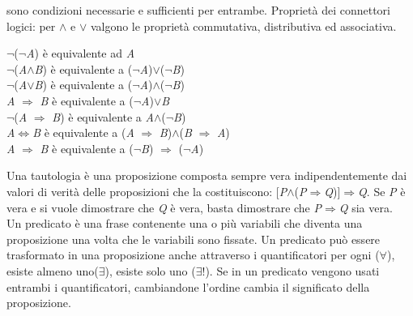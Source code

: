 sono condizioni necessarie e sufficienti per entrambe. Propriet\`a dei connettori logici: per $\wedge$ e $\lor$ valgono le propriet\`a commutativa, distributiva ed
associativa. 
\begin{center}
$\neg$($\neg$\textit{A}) \`e equivalente ad \textit{A}\\
$\neg$(\textit{A}$\wedge$\textit{B}) \`e equivalente a ($\neg$\textit{A})$\lor$($\neg$\textit{B})\\
$\neg$(\textit{A}$\lor$\textit{B}) \`e equivalente a ($\neg$\textit{A})$\wedge$($\neg$\textit{B})\\
\textit{A} $\Rightarrow$ \textit{B} \`e equivalente a ($\neg$\textit{A})$\lor$\textit{B}\\ 
$\neg$(\textit{A} $\Rightarrow$ \textit{B}) \`e equivalente a \textit{A}$\wedge$($\neg$\textit{B})\\ 
\textit{A}$\Leftrightarrow$\textit{B} \`e equivalente a (\textit{A} $\Rightarrow$ \textit{B})$\wedge$(\textit{B} $\Rightarrow$ \textit{A})\\
\textit{A} $\Rightarrow$ \textit{B} \`e equivalente a ($\neg$\textit{B}) $\Rightarrow$ ($\neg$\textit{A})
\end{center}
Una tautologia \`e una proposizione composta sempre vera indipendentemente dai valori di verit\`a delle proposizioni che la costituiscono: [\textit{P}$\wedge$(\textit{P}$\Rightarrow$\textit{Q})]$\Rightarrow$\textit{Q}. Se \textit{P} \`e vera e si vuole dimostrare che \textit{Q} \`e vera, basta dimostrare che \textit{P}$\Rightarrow$\textit{Q} sia vera.\\
Un predicato \`e una frase contenente una o pi\`u variabili che diventa una proposizione una volta che le variabili sono fissate. 
Un predicato pu\`o essere trasformato in una proposizione anche attraverso i quantificatori per ogni ($\forall$), esiste almeno uno($\exists$), esiste solo uno ($\exists !$). Se in un predicato vengono usati entrambi i quantificatori, cambiandone l'ordine cambia il significato della proposizione.